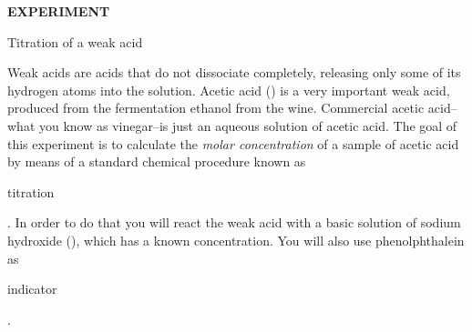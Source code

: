 \documentclass[main.tex]{subfiles}
\begin{document}
\pagestyle{empty}


\hfill
\vspace{0.2cm}
\begin{center}
{\large \bfseries 
EXPERIMENT 
\par
\Huge
Titration of a weak acid
\\[5pt] \par}
\vspace{0.2cm}
\end{center}
\par

\vspace{0.2cm}{\large \bfseries Goal}
Weak acids are acids that do not dissociate completely, releasing only some of its hydrogen atoms into the solution. Acetic acid ()  is a very important weak acid, produced from the fermentation ethanol from the wine. Commercial acetic acid--what you know as vinegar--is just an aqueous solution of acetic acid. The goal of this experiment is to calculate the \textit{molar concentration} of a sample of acetic acid by means of a standard chemical procedure known as \begin{it}titration\end{it}. In order to do that you will react the weak acid with a basic solution of sodium hydroxide (), which has a known concentration. You will also use phenolphthalein as \begin{it}indicator\end{it}. 
\end{document}
